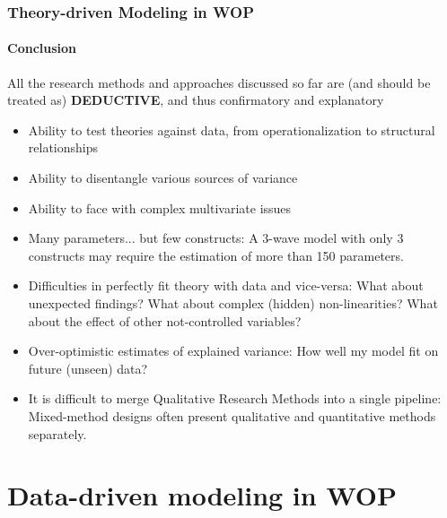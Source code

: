 \documentclass{beamer}
\begin{document}
\begin{frame}
	\frametitle{Theory-driven Modeling in WOP}
	\framesubtitle{Conclusion}
	
	{\scriptsize All the research methods and approaches discussed so far are (and should be treated as) \textbf{DEDUCTIVE}, and thus confirmatory and explanatory
		
    \color{green}{Advantages}
		\begin{itemize}
			\item Ability to test theories against data, from operationalization to structural relationships
			\item Ability to disentangle various sources of variance
			\item Ability to face with complex multivariate issues
		\end{itemize}
	
	\color{red}{Disadvantages}
		\begin{itemize}
			\item Many parameters... but few constructs: {\tiny A 3-wave model with only 3 constructs may require the estimation of more than 150 parameters.}
			\item Difficulties in perfectly fit theory with data and vice-versa: {\tiny What about unexpected findings? What about complex (hidden) non-linearities? What about the effect of other not-controlled variables?}
			\item Over-optimistic estimates of explained variance: {\tiny How well my model fit on future (unseen) data?}
			\item It is difficult to merge Qualitative Research Methods into a single pipeline: {\tiny Mixed-method designs often present qualitative and quantitative methods separately.}
		\end{itemize}}	
\end{frame}



\section{Data-driven modeling in WOP}
\end{document}
